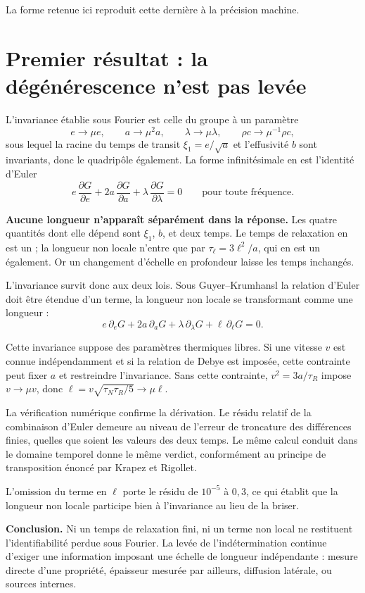 \documentclass[11pt,a4paper]{article}
\begin{document}
La forme retenue ici reproduit cette dernière à la précision machine.

\section{Premier résultat : la dégénérescence n'est pas levée}

L'invariance établie sous Fourier est celle du groupe à un paramètre
\[ e \to \mu e, \qquad a \to \mu^2 a, \qquad \lambda \to \mu\lambda, \qquad \rho c \to \mu^{-1}\rho c , \]
sous lequel la racine du temps de transit $\xi_1 = e/\sqrt{a}$ et l'effusivité $b$ sont invariants, donc le
quadripôle également. La forme infinitésimale en est l'identité d'Euler
\[ e\,\frac{\partial G}{\partial e} + 2a\,\frac{\partial G}{\partial a}
+ \lambda\,\frac{\partial G}{\partial \lambda} = 0
\qquad\text{pour toute fréquence.} \]

\textbf{Aucune longueur n'apparaît séparément dans la réponse.} Les quatre quantités dont elle
dépend sont $\xi_1$, $b$, et deux temps. Le temps de relaxation en est un ; la longueur non locale
n'entre que par $\tau_\ell = 3\ell^2/a$, qui en est un également. Or un changement d'échelle en
profondeur laisse les temps inchangés.

L'invariance survit donc aux deux lois. Sous Guyer--Krumhansl la relation d'Euler doit être étendue
d'un terme, la longueur non locale se transformant comme une longueur :
\[ e\,\partial_e G + 2a\,\partial_a G + \lambda\,\partial_\lambda G + \ell\,\partial_\ell G = 0 . \]

Cette invariance suppose des paramètres thermiques libres. Si une vitesse $v$ est connue indépendamment et si la relation de Debye est imposée, cette contrainte peut fixer $a$ et restreindre l'invariance. Sans cette contrainte, $v^2 = 3a/\tau_R$ impose
$v \to \mu v$, donc $\ell = v\sqrt{\tau_N\tau_R/5} \to \mu\ell$.

La vérification numérique confirme la dérivation. Le résidu relatif de la combinaison d'Euler
demeure au niveau de l'erreur de troncature des différences finies, quelles que soient les valeurs
des deux temps. Le même calcul conduit dans le domaine temporel donne le même verdict, conformément
au principe de transposition énoncé par Krapez et Rigollet.

L'omission du terme en $\ell$ porte le résidu de $10^{-5}$ à $0{,}3$, ce qui établit que la longueur
non locale participe bien à l'invariance au lieu de la briser.

\textbf{Conclusion.} Ni un temps de relaxation fini, ni un terme non local ne restituent
l'identifiabilité perdue sous Fourier. La levée de l'indétermination continue d'exiger une
information imposant une échelle de longueur indépendante : mesure directe d'une propriété,
épaisseur mesurée par ailleurs, diffusion latérale, ou sources internes.
\end{document}
